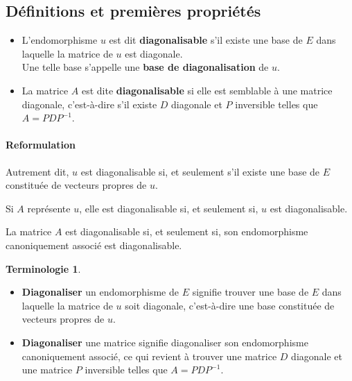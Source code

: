 \documentclass[french]{article}
\newcommand{\inv}{^{-1}}
\theoremstyle{plain}
\theoremstyle{definition}
\newtheorem*{terminologie}{Terminologie}
\theoremstyle{remark}
\begin{document}
	\subsection{Définitions et premières propriétés}
	
	\begin{dfn}
		\begin{itemize}
			\item L'endomorphisme $u$ est dit \textbf{diagonalisable} s'il existe une base de $E$ dans laquelle la matrice de $u$ est diagonale.\\
			Une telle base s'appelle une \textbf{base de diagonalisation} de $u$.
			\item La matrice $A$ est dite \textbf{diagonalisable} si elle est semblable à une matrice diagonale, c'est-à-dire s'il existe $D$ diagonale et $P$ inversible telles que $A=PDP\inv$.
		\end{itemize}
	\end{dfn}
	
	\paragraph{Reformulation} Autrement dit, $u$ est diagonalisable si, et seulement s'il existe une base de $E$ constituée de vecteurs propres de $u$.
	
	\begin{prop}%
		Si $A$ représente $u$, elle est diagonalisable si, et seulement si, $u$ est diagonalisable.
	\end{prop}
	
	\begin{cor}%
		La matrice $A$ est diagonalisable si, et seulement si, son endomorphisme canoniquement associé est diagonalisable.
	\end{cor}
	
	\begin{terminologie}
		\begin{itemize}
		\item \textbf{Diagonaliser} un endomorphisme de $E$ signifie trouver une base de $E$ dans laquelle la matrice de $u$ soit diagonale, c'est-à-dire une base constituée de vecteurs propres de $u$.
		\item \textbf{Diagonaliser} une matrice signifie diagonaliser son endomorphisme canoniquement associé, ce qui revient à trouver une matrice $D$ diagonale et une matrice $P$ inversible telles que $A=PDP\inv$.
	\end{itemize}
	\end{terminologie}
	
\end{document}
